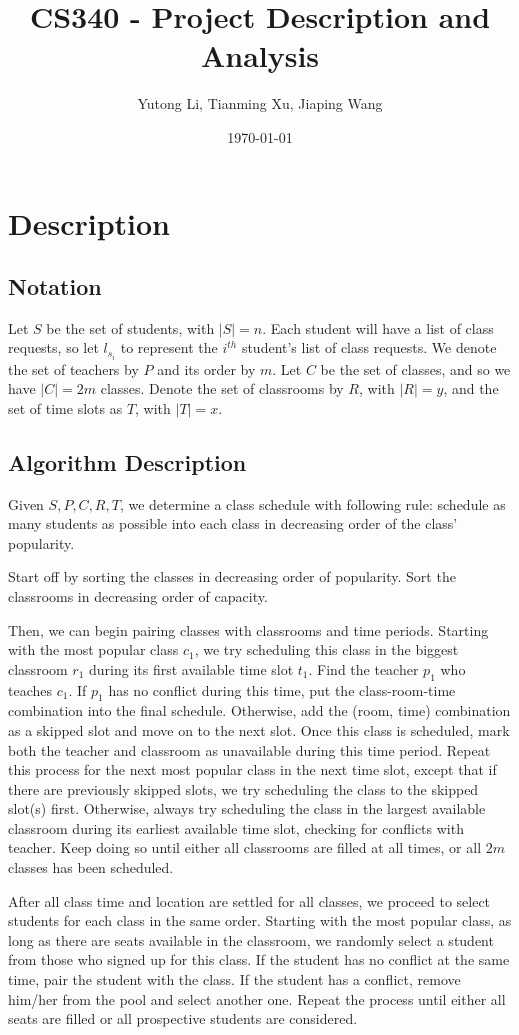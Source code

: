 \documentclass[11pt, oneside]{article}   	%
\title{CS340 - Project Description and Analysis}
\author{Yutong Li, Tianming Xu, Jiaping Wang}
\date{\today}							%
\begin{document}
\maketitle

\section{Description}
\subsection{Notation}
Let $S$ be the set of students, with $|S|=n$. Each student will have a list of class requests, so let $l_{s_i}$ to represent the $i^{th}$ student's list of class requests. We denote the set of teachers by $P$ and its order by $m$. Let $C$ be the set of classes, and so we have $|C|=2m$ classes. Denote the set of classrooms by $R$, with $|R|=y$, and the set of time slots as $T$, with $|T|=x$. 
\subsection{Algorithm Description}
Given $S, P, C, R, T$, we determine a class schedule with following rule: schedule as many students as possible into each class in decreasing order of the class' popularity. \par 
Start off by sorting the classes in decreasing order of popularity. Sort the classrooms in decreasing order of capacity. \par
Then, we can begin pairing classes with classrooms and time periods. Starting with the most popular class $c_1$, we try scheduling this class in the biggest classroom $r_1$ during its first available time slot $t_1$. Find the teacher $p_1$ who teaches $c_1$. If $p_1$ has no conflict during this time, put the class-room-time combination into the final schedule. Otherwise, add the (room, time) combination as a skipped slot and move on to the next slot. Once this class is scheduled, mark both the teacher and classroom as unavailable during this time period. Repeat this process for the next most popular class in the next time slot, except that if there are previously skipped slots, we try scheduling the class to the skipped slot(s) first. Otherwise, always try scheduling the class in the largest available classroom during its earliest available time slot, checking for conflicts with teacher. Keep doing so until either all classrooms are filled at all times, or all $2m$ classes has been scheduled.\par
After all class time and location are settled for all classes, we proceed to select students for each class in the same order. Starting with the most popular class, as long as there are seats available in the classroom, we randomly select a student from those who signed up for this class. If the student has no conflict at the same time, pair the student with the class. If the student has a conflict, remove him/her from the pool and select another one. Repeat the process until either all seats are filled or all prospective students are considered.
\end{document}
